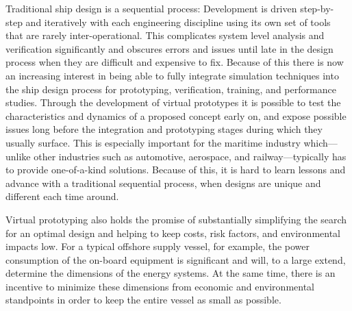 \documentclass[prb,aps,showpacs,floatfix,twocolumn,10pt]{revtex4-1}
\theoremstyle{plain}
\theoremstyle{remark}
\begin{document}
Traditional ship design is a sequential process:\cite{Evans1959}
Development is driven step-by-step and iteratively with each engineering discipline using its own set of tools that are rarely inter-operational.
This complicates system level analysis and verification significantly and obscures errors and issues until late in the design process when they are difficult and expensive to fix.
Because of this there is now an increasing interest in being able to fully integrate simulation techniques into the ship design process for prototyping, verification, training, and performance studies.\cite{Hassani2016}
Through the development of virtual prototypes it is possible to test the characteristics and dynamics of a proposed concept early on, and expose possible issues long before the integration and prototyping stages during which they usually surface.
This is especially important for the maritime industry which---unlike other industries such as automotive, aerospace, and railway---typically has to provide one-of-a-kind solutions.
Because of this, it is hard to learn lessons and advance with a traditional sequential process, when designs are unique and different each time around.

Virtual prototyping also holds the promise of substantially simplifying the search for an optimal design and helping to keep costs, risk factors, and environmental impacts low.
For a typical offshore supply vessel, for example, the power consumption of the on-board equipment is significant and will, to a large extend, determine the dimensions of the energy systems.
At the same time, there is an incentive to minimize these dimensions from economic and environmental standpoints in order to keep the entire vessel as small as possible.
\end{document}
